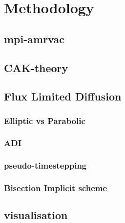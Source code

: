 \chapter{Methodology}

\section{mpi-amrvac} \label{section: methods amrvac}

\section{CAK-theory}

\section{Flux Limited Diffusion}
\subsection{Elliptic vs Parabolic}
\subsection{ADI}
\subsection{pseudo-timestepping}
\subsection{Bisection Implicit scheme}

\section{visualisation}
